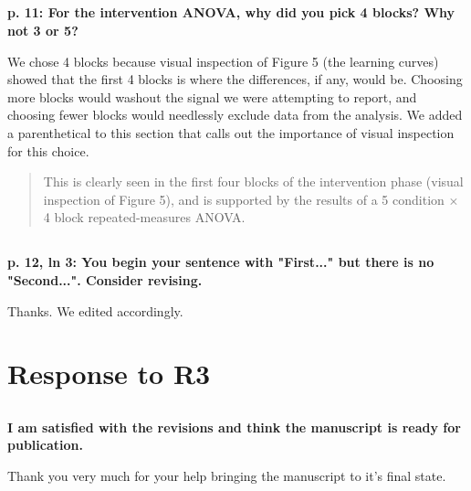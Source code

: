\documentclass[10pt,a4paper]{article}
\begin{document}
\subsection{} \textbf{p. 11: For the intervention ANOVA, why did you pick 4
  blocks? Why not 3 or 5?}

We chose 4 blocks because visual inspection of Figure 5 (the learning curves)
showed that the first 4 blocks is where the differences, if any, would be.
Choosing more blocks would washout the signal we were attempting to report, and
choosing fewer blocks would needlessly exclude data from the analysis. We added a
parenthetical to this section that calls out the importance of visual inspection
for this choice.

\begin{quote}
  This is clearly seen in the first four blocks of the intervention phase
  (visual inspection of Figure 5), and is supported by the
  results of a 5 condition $\times$ 4 block repeated-measures ANOVA.
\end{quote}

\subsection{} \textbf{p. 12, ln 3: You begin your sentence with "First..." but
  there is no "Second...". Consider revising.}

Thanks. We edited accordingly.

\section{Response to R3}
\subsection{} \textbf{I am satisfied with the revisions and think the manuscript is ready for publication.}

Thank you very much for your help bringing the manuscript to it's final state.
\end{document}
